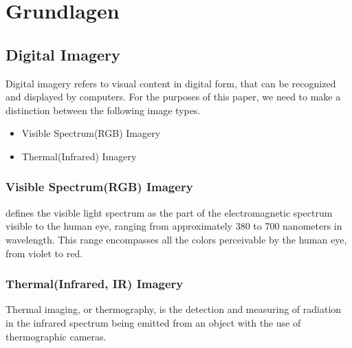\chapter{Grundlagen}

\section{Digital Imagery}
Digital imagery refers to visual content in digital form, that can be recognized and displayed by computers. For the purposes of this paper, we need to make a distinction between the following image types.

\begin{itemize}
	\item{Visible Spectrum(RGB) Imagery}
	\item{Thermal(Infrared) Imagery}
\end{itemize}

\subsection{Visible Spectrum(RGB) Imagery}

\cite{nasa_visiblelight} defines the visible light spectrum as the part of the electromagnetic spectrum visible to the human eye, ranging from approximately 380 to 700 nanometers in wavelength. This range encompasses all the colors perceivable by the human eye, from violet to red.

\subsection{Thermal(Infrared, IR) Imagery}
Thermal imaging, or thermography, is the detection and measuring of radiation in the infrared spectrum being emitted from an object with the use of thermographic cameras. \citep{spi_thermal}










